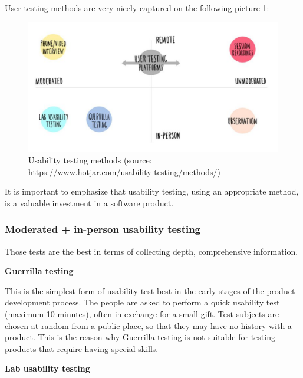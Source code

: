 \documentclass[a4paper,10pt,twoside]{article}
\begin{document}
\noindent User testing methods are very nicely captured on the following picture \ref{fig:usability_testing_methods}:

\vspace{0.3cm}
\begin{figure}[hbt!] 
\begin{center}
\includegraphics[width=15cm]{../pictures/usability_testing_methods.png} 
\caption[Usability testing methods]{Usability testing methods (source: https://www.hotjar.com/usability-testing/methods/)}
\label{fig:usability_testing_methods}
\end{center}
\end{figure}

\noindent It is important to emphasize that usability testing, using an appropriate method, is a valuable investment in a software product.
 
\subsubsection{Moderated + in-person usability testing}
Those tests are the best  in terms of collecting depth, comprehensive information. 
\smallskip

\noindent \textbf {Guerrilla testing}

\noindent This is the simplest form of usability test best in the early stages of the product development process. The people are asked to perform a quick usability test (maximum 10 minutes), often in exchange for a small gift. Test subjects are chosen at random from a public place, so that they may have no history with a product. This is the reason why Guerrilla testing is not suitable for testing products that require having special skills.

\smallskip

\noindent \textbf {Lab usability testing}
\end{document}
